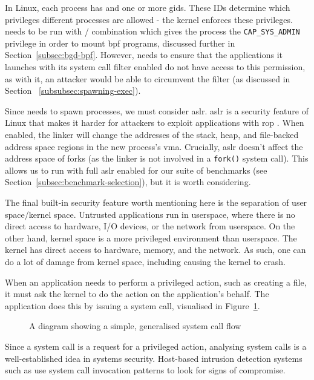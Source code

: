 In Linux, each process has  and one or more \acp{gid}.
These IDs determine which privileges different processes are allowed - the kernel enforces these
privileges. \af needs to be run with
/ combination which gives the process the
\texttt{CAP\_SYS\_ADMIN} privilege in order to mount \ac{bpf} programs,
discussed further in Section~\ref{subsec:bgd-bpf}. However, \af needs to ensure
that the applications it launches with its system call filter enabled do not
have access to this permission, as with it, an attacker would be able to
circumvent the filter (as discussed in Section ~\ref{subsubsec:spawning-exec}).

Since \af needs to spawn processes, we must consider \ac{aslr}. \ac{aslr} is a security feature of Linux that makes it harder for
attackers to exploit applications with \ac{rop} \cite{ASLR_GUARD}. When
enabled, the linker will change the addresses of the stack, heap, and file-backed address space regions in the new process's \ac{vma}. Crucially, \ac{aslr}
doesn't affect the address space of forks (as the linker is not involved in
a \texttt{fork()} system call). This allows us to run \af with full \ac{aslr}
enabled for our suite of benchmarks (see 
Section~\ref{subsec:benchmark-selection}), but it is worth considering.  

The final built-in security feature worth mentioning here is the separation of user
space/kernel space. Untrusted applications run in userspace, where there is no direct access to hardware, I/O devices, or the 
network from userspace. On the other hand, kernel space is a more privileged 
environment than userspace. The kernel has direct access to hardware, memory, and the
network. As such, one can do a lot of damage from kernel space, including causing
the kernel to crash.

When an application needs to perform a privileged action, such as creating a
file, it must ask the kernel to do the action on the application's behalf. The
application does this by issuing a system call, visualised in
Figure~\ref{fig:syscall-flow}.

\begin{figure}[h]
\centering
{}
\caption{A diagram showing a simple, generalised system call
flow}\label{fig:syscall-flow}
\end{figure}

Since a system call is a request for a privileged action, analysing system calls
is a well-established idea in systems security. Host-based intrusion detection
systems such as \cite{10.1145/3214304} use system call invocation patterns to look for
signs of compromise.

